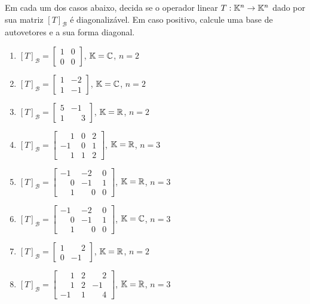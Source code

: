 \documentclass[12pt]{exam}
\begin{document}
\begin{exercicio}
  Em cada um dos casos abaixo, decida se o operador linear $T : \mathbb{K}^n \to \mathbb{K}^n$ dado por sua matriz $[T]_\mathcal{B}$ é diagonalizável. Em caso positivo, calcule uma base de autovetores e a sua forma diagonal.
  \begin{enumerate}[label=({\alph*})]
    \item $[T]_\mathcal{B} = \begin{bmatrix} 1 & 0\\ 0 & 0\end{bmatrix}$, $\mathbb{K} = \mathbb{C}$, $n = 2$
    \item $[T]_\mathcal{B} = \begin{bmatrix} 1 & -2\\ 1 & -1\end{bmatrix}$, $\mathbb{K} = \mathbb{C}$, $n = 2$
    \item $[T]_\mathcal{B} = \begin{bmatrix} 5 & -1\\ 1 & \phantom{-} 3\end{bmatrix}$, $\mathbb{K} = \mathbb{R}$, $n = 2$
    \item $[T]_\mathcal{B} = \begin{bmatrix} \phantom{-} 1 & 0 & 2\\ -1 & 0 & 1\\ \phantom{-} 1 & 1 & 2\end{bmatrix}$, $\mathbb{K} = \mathbb{R}$, $n = 3$
    \item $[T]_\mathcal{B} = \begin{bmatrix} -1 & -2 & 0\\ \phantom{-} 0 & -1 & 1\\ \phantom{-} 1 & \phantom{-} 0 & 0\end{bmatrix}$, $\mathbb{K} = \mathbb{R}$, $n = 3$
    \item $[T]_\mathcal{B} = \begin{bmatrix} -1 & -2 & 0\\ \phantom{-} 0 & -1 & 1\\ \phantom{-} 1 & \phantom{-} 0 & 0\end{bmatrix}$, $\mathbb{K} = \mathbb{C}$, $n = 3$
    \item $[T]_\mathcal{B} = \begin{bmatrix} 1 & \phantom{-} 2\\ 0 & -1\end{bmatrix}$, $\mathbb{K} = \mathbb{R}$, $n = 2$
    \item $[T]_\mathcal{B} = \begin{bmatrix} \phantom{-} 1 & 2 & \phantom{-} 2\\ \phantom{-} 1 & 2 & -1\\ -1 & 1 & \phantom{-} 4\end{bmatrix}$, $\mathbb{K} = \mathbb{R}$, $n = 3$

\end{enumerate}
\end{exercicio}
\end{document}
